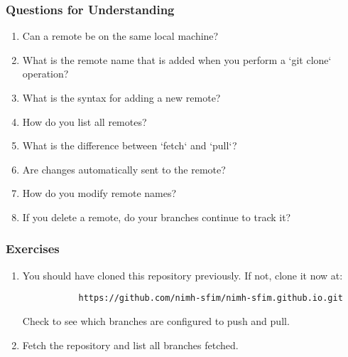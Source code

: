 \subsubsection{Questions for Understanding}
\begin{enumerate}
	\item Can a remote be on the same local machine?
	\item What is the remote name that is added when you perform a `git clone`
	  operation?
	\item What is the syntax for adding a new remote?
	\item How do you list all remotes?
	\item What is the difference between `fetch` and `pull`?
	\item Are changes automatically sent to the remote?
	\item How do you modify remote names?
	\item If you delete a remote, do your branches continue to track it?
\end{enumerate}

\subsubsection{Exercises}
\begin{enumerate}
	\item You should have cloned this repository previously.
	   If not, clone it now at:
	   \begin{verbatim}
		   https://github.com/nimh-sfim/nimh-sfim.github.io.git
	   \end{verbatim}
	   Check to see which branches are configured to push and pull.
	\item Fetch the repository and list all branches fetched.
\end{enumerate}
